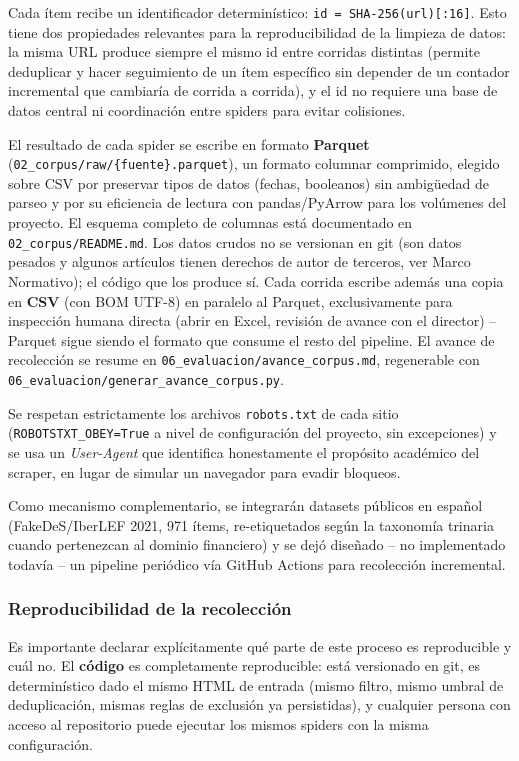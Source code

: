 Cada ítem recibe un identificador determinístico: \texttt{id = SHA-256(url)[:16]}. Esto tiene dos propiedades relevantes para la reproducibilidad de la limpieza de datos: la misma URL produce siempre el mismo id entre corridas distintas (permite deduplicar y hacer seguimiento de un ítem específico sin depender de un contador incremental que cambiaría de corrida a corrida), y el id no requiere una base de datos central ni coordinación entre spiders para evitar colisiones.

El resultado de cada spider se escribe en formato \textbf{Parquet} (\texttt{02\_corpus/raw/\{fuente\}.parquet}), un formato columnar comprimido, elegido sobre CSV por preservar tipos de datos (fechas, booleanos) sin ambigüedad de parseo y por su eficiencia de lectura con pandas/PyArrow para los volúmenes del proyecto. El esquema completo de columnas está documentado en \texttt{02\_corpus/README.md}. Los datos crudos no se versionan en git (son datos pesados y algunos artículos tienen derechos de autor de terceros, ver Marco Normativo); el código que los produce sí. Cada corrida escribe además una copia en \textbf{CSV} (con BOM UTF-8) en paralelo al Parquet, exclusivamente para inspección humana directa (abrir en Excel, revisión de avance con el director) -- Parquet sigue siendo el formato que consume el resto del pipeline. El avance de recolección se resume en \texttt{06\_evaluacion/avance\_corpus.md}, regenerable con \texttt{06\_evaluacion/generar\_avance\_corpus.py}.

Se respetan estrictamente los archivos \texttt{robots.txt} de cada sitio (\texttt{ROBOTSTXT\_OBEY=True} a nivel de configuración del proyecto, sin excepciones) y se usa un \textit{User-Agent} que identifica honestamente el propósito académico del scraper, en lugar de simular un navegador para evadir bloqueos.

Como mecanismo complementario, se integrarán datasets públicos en español (FakeDeS/IberLEF 2021, 971 ítems, re-etiquetados según la taxonomía trinaria cuando pertenezcan al dominio financiero) y se dejó diseñado -- no implementado todavía -- un pipeline periódico vía GitHub Actions para recolección incremental.

\subsubsection{Reproducibilidad de la recolección}

Es importante declarar explícitamente qué parte de este proceso es reproducible y cuál no. El \textbf{código} es completamente reproducible: está versionado en git, es determinístico dado el mismo HTML de entrada (mismo filtro, mismo umbral de deduplicación, mismas reglas de exclusión ya persistidas), y cualquier persona con acceso al repositorio puede ejecutar los mismos spiders con la misma configuración.


